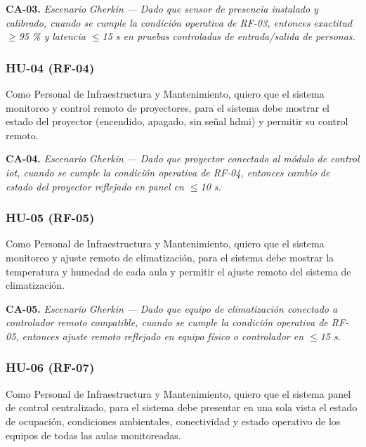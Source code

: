 \textbf{CA-03.} \textit{Escenario }\textit{Gherkin}\textit{ --- Dado que sensor de presencia instalado y calibrado, cuando se cumple la condición operativa de RF-03, entonces exactitud $\geq$95 \% y latencia $\leq$15 s en pruebas controladas de entrada/salida de personas.}


\subsubsection*{HU-04 (RF-04)}


Como Personal de Infraestructura y Mantenimiento, quiero que el sistema monitoreo y control remoto de proyectores, para el sistema debe mostrar el estado del proyector (encendido, apagado, sin señal hdmi) y permitir su control remoto.


\textbf{CA-04.} \textit{Escenario }\textit{Gherkin}\textit{ --- Dado que proyector conectado al módulo de control }\textit{iot}\textit{, cuando se cumple la condición operativa de RF-04, entonces cambio de estado del proyector reflejado en panel en $\leq$10 s.}


\subsubsection*{HU-05 (RF-05)}


Como Personal de Infraestructura y Mantenimiento, quiero que el sistema monitoreo y ajuste remoto de climatización, para el sistema debe mostrar la temperatura y humedad de cada aula y permitir el ajuste remoto del sistema de climatización.


\textbf{CA-05.} \textit{Escenario }\textit{Gherkin}\textit{ --- Dado que equipo de climatización conectado a controlador remoto compatible, cuando se cumple la condición operativa de RF-05, entonces ajuste remoto reflejado en equipo físico o controlador en $\leq$15 s.}


\subsubsection*{HU-06 (RF-07)}


Como Personal de Infraestructura y Mantenimiento, quiero que el sistema panel de control centralizado, para el sistema debe presentar en una sola vista el estado de ocupación, condiciones ambientales, conectividad y estado operativo de los equipos de todas las aulas monitoreadas.


